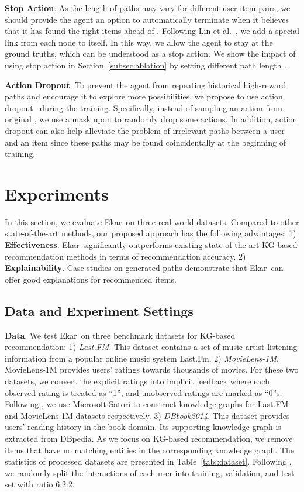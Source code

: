 \documentclass{article}
\newcommand{\name}{Ekar}
\newcommand{\xhdr}[1]{{\noindent\bfseries #1}.}
\begin{document}
\xhdr{Stop Action} As the length of paths may vary for different user-item pairs, we should provide the agent an option to automatically terminate when it believes that it has found the right items ahead of .
Following Lin et al.~\cite{lin2018multi}, we add a special link from each node to itself. In this way, we allow the agent to stay at the ground truths, which can be understood as a stop action. We show the impact of using stop action in Section~\ref{subsec:ablation} by setting different path length .

\xhdr{Action Dropout} To prevent the agent from repeating historical high-reward paths and encourage it to explore more possibilities, we propose to use action dropout~\cite{lin2018multi} during the training. Specifically, instead of sampling an action from original , we use a mask upon  to randomly drop some actions. In addition, action dropout can also help alleviate the problem of irrelevant paths between a user and an item since these paths may be found coincidentally at the beginning of training. \section{Experiments}
In this section, we evaluate \name\ on three real-world datasets. Compared to other state-of-the-art methods, our proposed approach has the following advantages:
1) \textbf{Effectiveness}. \name\ significantly outperforms existing state-of-the-art KG-based recommendation methods in terms of recommendation accuracy. 2) \textbf{Explainability}. Case studies on generated paths demonstrate that \name\ can offer good explanations for recommended items.





\subsection{Data and Experiment Settings}



\xhdr{Data}
We test \name\ on three benchmark datasets for KG-based recommendation: 1) \textit{Last.FM}.
This dataset contains a set of music artist listening information from a popular online music system Last.Fm. 2) \textit{MovieLens-1M}.
MovieLens-1M provides users' ratings towards thousands of movies. For these two datasets, we convert the explicit ratings into implicit feedback where each observed rating is treated as ``1'', and unobserved ratings are marked as ``0''s. Following \cite{Wang_2019}, we use Microsoft Satori to construct knowledge graphs for Last.FM and MovieLens-1M datasets respectively. 3) \textit{DBbook2014}.
This dataset provides users' reading history in the book domain. Its supporting knowledge graph is extracted from DBpedia.
As we focus on KG-based recommendation, we remove items that have no matching entities in the corresponding knowledge graph. The statistics of processed datasets are presented in Table~\ref{tab::dataset}. Following \cite{Cao_2019,wang2018ripplenet,Wang2018ExplainableRO}, we randomly split the interactions of each user into training, validation, and test set with ratio 6:2:2.
\end{document}
